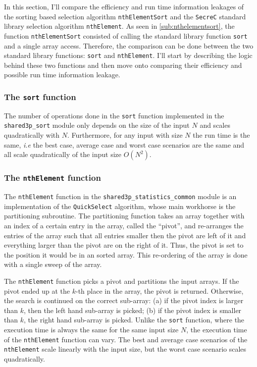 \documentclass[11pt]{article}
\newcommand{\ct}[1]{\texttt{#1}}
\newcommand{\SC}{\ct{SecreC}\xspace}
\begin{document}
In this section, I'll compare the efficiency and run time information leakages of the sorting based selection algorithm \ct{nthElementSort} and the \SC standard library selection algorithm \ct{nthElement}. As seen in \cref{sub:nthelementsort}, the function \ct{nthElementSort} consisted of calling the standard library function \ct{sort} and a single array access. Therefore, the comparison can be done between the two standard library functions: \ct{sort} and \ct{nthElement}. I'll start by describing the logic behind these two functions and then move onto comparing their efficiency and possible run time information leakage.

\subsubsection{The \ct{sort} function} %
\label{ssub:the_sort_function}
 
The number of operations done in the \ct{sort} function implemented in the \ct{shared3p\_sort} module only depends on the size of the input $N$ and scales quadratically with $N$. Furthermore, for any input with size $N$ the run time is the same, \emph{i.e} the best case, average case and worst case scenarios are the same and all scale quadratically of the input size $O(N^2)$.   


\subsubsection{The \ct{nthElement} function} %
\label{ssub:the_nthelement_function}

The \ct{nthElement} function in the \ct{shared3p\_statistics\_common} module is an implementation of the \ct{QuickSelect} algorithm, whose main workhorse is the partitioning subroutine. The partitioning function takes an array together with an index of a certain entry in the array, called the ``pivot'', and re-arranges the entries of the array such that all entries smaller then the pivot are left of it and everything larger than the pivot are on the right of it. Thus, the pivot is set to the position it would be in an sorted array. This re-ordering of the array is done with a single sweep of the array. 

The \ct{nthElement} function picks a pivot and partitions the input arrays. If the pivot ended up at the $k$-th place in the array, the pivot is returned. Otherwise, the search is continued on the correct sub-array: (a) if the pivot index is larger than $k$, then the left hand sub-array is picked; (b) if the pivot index is smaller than $k$, the right hand sub-array is picked. Unlike the \ct{sort} function, where the execution time is always the same for the same input size $N$, the execution time of the \ct{nthElement} function can vary. The best and average case scenarios of the \ct{nthElement} scale linearly with the input size, but the worst case scenario scales quadratically.  
\end{document}
